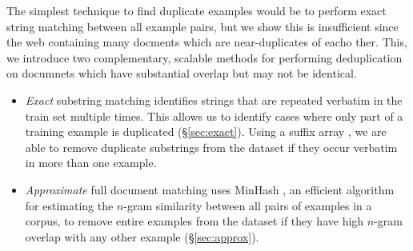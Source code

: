 The simplest technique to find duplicate examples would be to perform exact string matching between all example pairs, but we show this is insufficient since the web containing many docments which are near-duplicates of eacho ther.
This, we introduce two complementary, scalable methods for performing deduplication on documnets which have substantial overlap but may not be identical.
\begin{itemize}
    \item
\textit{Exact} substring matching identifies strings that are repeated verbatim in the train set multiple times.
This allows us to identify cases where only part of a training example is duplicated (\S\ref{sec:exact}).
Using a suffix array \cite{manber1993suffix}, we are able to remove duplicate substrings from the dataset if they occur verbatim in more than one example.
    \item
\textit{Approximate} full document matching uses  MinHash \citep{broder1997resemblance}, an efficient algorithm for estimating the $n$-gram similarity between all pairs of examples in a corpus, to remove entire examples from the dataset if they have high $n$-gram overlap with any other example (\S\ref{sec:approx}).
\end{itemize}

